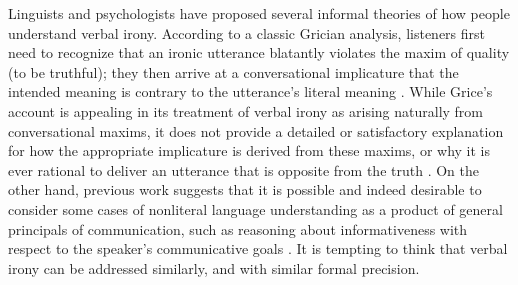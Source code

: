 \documentclass[10pt,letterpaper]{article}
\begin{document}
Linguists and psychologists have proposed several informal theories of how people understand verbal irony. According to a classic Grician analysis, listeners first need to recognize that an ironic utterance blatantly violates the maxim of quality (to be truthful); they then arrive at a conversational implicature that the intended meaning is contrary to the utterance's literal meaning \cite{grice20134, wilson2006pragmatics}. While Grice's account is appealing in its treatment of verbal irony as arising naturally from conversational maxims, it does not provide a detailed or satisfactory explanation for how the appropriate implicature is derived from these maxims, or why it is ever rational to deliver an utterance that is opposite from the truth \cite{wilson2006pragmatics}. 
On the other hand, previous work suggests that it is possible and indeed desirable to consider some cases of nonliteral language understanding as a product of general principals of communication, such as reasoning about informativeness with respect to the speaker's communicative goals \cite{kao2014nonliteral, kao2014formalizing}. It is tempting to think that verbal irony can be addressed similarly, and with similar formal precision.
\end{document}
